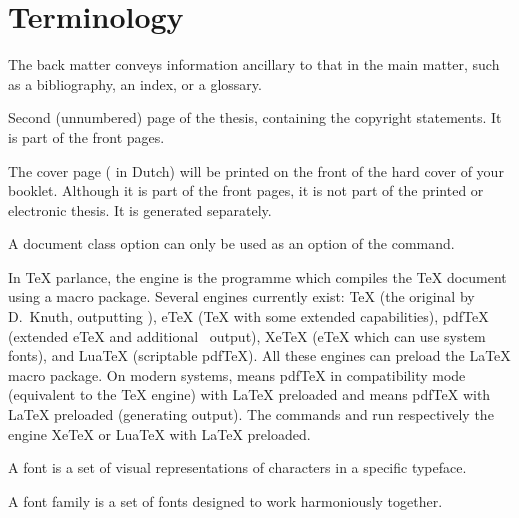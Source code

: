 \newenvironment{termlist}%
 {\renewcommand*\descriptionlabel[1]{\hspace\labelsep
    \normalfont\scshape ##1}%
  \let\olditem\item
  \renewcommand*\item[1][??]{\olditem[##1]\leavevmode\newline\ignorespaces}%
  \newcommand*\latex{\unskip\quad\upshape (LaTeX)}%
  \description}%
 {\enddescription}

\chapter{Terminology}
\label{cha:terminology}
\begin{termlist}
\item[Back matter]
  The back matter conveys information ancillary to that in the main matter,
  such as a bibliography, an index, or a glossary.
\item[Copyright page]
  Second (unnumbered) page of the thesis, containing the copyright
  statements. It is part of the front pages.
\item[Cover page]
  The cover page ( in Dutch) will be printed on the front of the
  hard cover of your booklet. Although it is part of the front pages, it is not
  part of the printed or electronic thesis. It is generated separately.
\item[Document class option \latex]
  A document class option can only be used as an option of the
   command.
\item[Engine \latex]
  In TeX parlance, the engine is the programme which compiles the TeX document
  using a macro package. Several engines currently exist: TeX (the original by
  D.\ Knuth, outputting ), eTeX (TeX with some extended
  capabilities), pdfTeX (extended eTeX and additional \PDF\ output), XeTeX
  (eTeX which can use system fonts), and \mbox{LuaTeX} (scriptable pdfTeX). All
  these engines can preload the LaTeX macro package. On modern systems,
   means pdfTeX in compatibility mode (equivalent to the TeX
  engine) with LaTeX preloaded and  means pdfTeX with LaTeX
  preloaded (generating  output). The commands  and
   run respectively the engine XeTeX or LuaTeX with LaTeX
  preloaded.
\item[Font]
  A font is a set of visual representations of characters in a specific
  typeface.
\item[Font family]
  A font family is a set of fonts designed to work harmoniously together.

\end{termlist}
